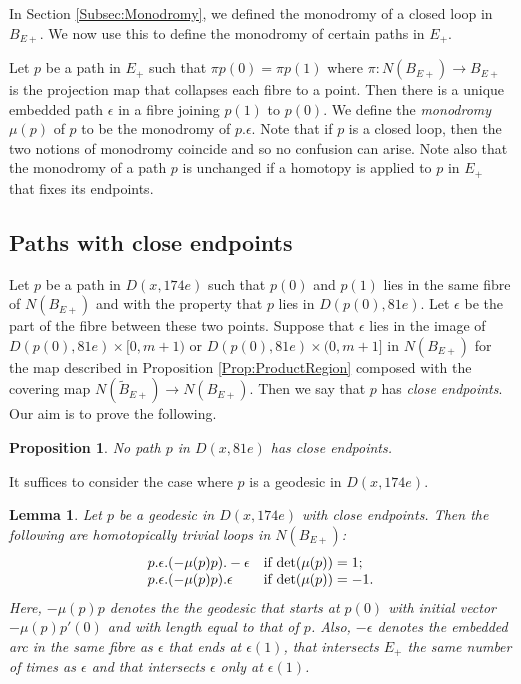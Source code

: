 \documentclass[oneside]{amsart}
\numberwithin{equation}{section}
\theoremstyle{plain}
\newtheorem{lemma}[equation]{Lemma}
\newtheorem{proposition}[equation]{Proposition}
\theoremstyle{definition}
\begin{document}
In Section \ref{Subsec:Monodromy}, we defined the monodromy of a closed loop in $B_{E+}$. We now use this to define
the monodromy of certain paths in $E_+$.

Let $p$ be a path in $E_+$ such that $\pi p (0) = \pi p (1)$ where $\pi \colon N(B_{E+}) \rightarrow B_{E+}$
is the projection map that collapses each fibre to a point. Then there is a unique embedded
path $\epsilon$ in a fibre joining $p(1)$ to $p(0)$. We define the \emph{monodromy} $\mu(p)$ of $p$
to be the monodromy of $p . \epsilon$. Note that if $p$ is a closed loop, then the two
notions of monodromy coincide and so no confusion can arise. Note also that the monodromy
of a path $p$ is unchanged if a homotopy is applied to $p$ in $E_+$ that fixes its endpoints.

\subsection{Paths with close endpoints}

Let $p$ be a path in $D(x,174e)$ such that $p(0)$ and $p(1)$ lies in the same fibre of $N(B_{E+})$ and
with the property that $p$ lies in $D(p(0), 81e)$. Let $\epsilon$
be the part of the fibre between these two points. Suppose that $\epsilon$ lies in the image of 
$D(p(0), 81e) \times [0,m+1)$ or $D(p(0), 81e) \times (0,m+1]$ in $N(B_{E+})$ for the map described in Proposition
\ref{Prop:ProductRegion} composed with the covering map $N(\tilde B_{E+}) \rightarrow N(B_{E+})$. Then we say that $p$ has \emph{close endpoints}.
Our aim is to prove the following.

\begin{proposition}
\label{Prop:NoCloseEndpoints}
No path $p$ in $D(x, 81e)$ has close endpoints.
\end{proposition}

It suffices to consider the case where $p$ is a geodesic in $D(x,174e)$.

\begin{lemma}
\label{Lem:CloseEndpointsPath}
Let $p$ be a geodesic in $D(x,174e)$ with close endpoints. Then the following are homotopically trivial loops in $N(B_{E+})$:
$$\begin{array}{ll}
p . \epsilon. (-\mu(p)p). -\epsilon & \text{if } {\rm det}(\mu(p)) = 1; \cr
p . \epsilon. (-\mu(p)p). \epsilon & \text{if } {\rm det}(\mu(p)) = -1. \cr
\end{array}
$$
Here, $-\mu(p)p$ denotes the the geodesic that starts at $p(0)$ with initial vector $- \mu(p) p'(0)$ and
with length equal to that of $p$. Also, $-\epsilon$ denotes the embedded arc in the same
fibre as $\epsilon$ that ends at $\epsilon(1)$, that intersects $E_+$ the same
number of times as $\epsilon$ and that intersects $\epsilon$ only at $\epsilon(1)$.
\end{lemma}
\end{document}
